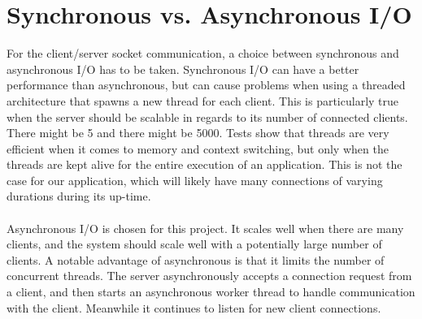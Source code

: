 




\section{Synchronous vs. Asynchronous I/O}
For the client/server socket communication, a choice between synchronous and asynchronous I/O has to be taken.
Synchronous I/O can have a better performance than asynchronous, but can cause problems when using a threaded architecture that spawns a new thread for each client. This is particularly true when the server should be scalable in regards to its number of connected clients. There might be 5 and there might be 5000.
Tests show that threads are very efficient when it comes to memory and context switching, but only when the threads are kept alive for the entire execution of an application. This is not the case for our application, which will likely have many connections of varying durations during its up-time. \\\\
Asynchronous I/O is chosen for this project. It scales well when there are many clients, and the system should scale well with a potentially large number of clients. A notable advantage of asynchronous is that it limits the number of concurrent threads. The server asynchronously accepts a connection request from a client, and then starts an asynchronous worker thread to handle communication with the client. Meanwhile it continues to listen for new client connections.


